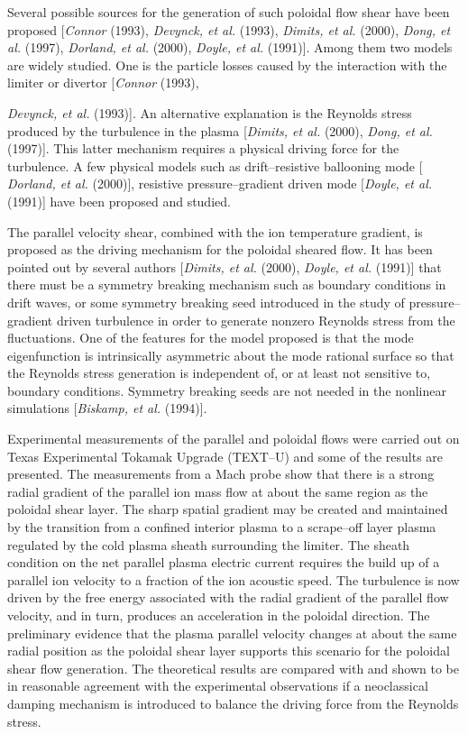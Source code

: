 \documentclass[a4paper,openany,12pt]{book}
\begin{document}
Several possible sources for the generation of such poloidal flow shear have been proposed [\emph{Connor} (1993), \emph{Devynck, et al.} (1993), \emph{Dimits, et al.} (2000), \emph{Dong, et al.} (1997), \emph{Dorland, et al.} (2000), \emph{Doyle, et al.} (1991)]. Among them two models are widely studied. One is the particle losses caused by the interaction with the limiter or divertor [\emph{Connor} (1993), {\emph{Devynck, et al.} (1993)]. An alternative explanation is the Reynolds stress produced by the turbulence in the plasma [\emph{Dimits, et al.} (2000), \emph{Dong, et al.} (1997)]. This latter mechanism requires a physical driving force for the turbulence. A few physical models such as drift--resistive ballooning mode [\emph{ Dorland, et al.} (2000)], resistive pressure--gradient driven mode [\emph{Doyle, et al.} (1991)] have been proposed and studied.

The parallel velocity shear, combined with the ion temperature gradient, is proposed as the driving mechanism for the poloidal sheared flow. It has been pointed out by several authors [\emph{Dimits, et al.} (2000), \emph{Doyle, et al.} (1991)] that there must be a symmetry breaking mechanism such as boundary conditions in drift waves, or some symmetry breaking seed introduced in the study of pressure--gradient driven turbulence in order to generate nonzero Reynolds stress from the fluctuations. One of the features for the model proposed  is that the mode eigenfunction is intrinsically asymmetric about the mode rational surface so that the Reynolds stress generation is independent of, or at least not sensitive to, boundary conditions. Symmetry breaking seeds are not needed in the nonlinear simulations [\emph{Biskamp, et al.} (1994)].

Experimental measurements of the parallel and poloidal flows were carried out on Texas Experimental Tokamak Upgrade (TEXT--U) and some of the results are presented. The measurements from a Mach probe show that there is a strong radial gradient of the parallel ion mass flow at about the same region as the poloidal shear layer. The sharp spatial gradient may be created and maintained by the transition from a confined interior plasma to a scrape--off layer plasma regulated by the cold plasma sheath surrounding the limiter. The sheath condition on the net parallel plasma electric current requires the build up of a parallel ion velocity to a fraction of the ion acoustic speed. The turbulence is now driven by the free energy associated with the radial gradient of the parallel flow velocity, and in turn, produces an acceleration in the poloidal direction. The preliminary evidence that the plasma parallel velocity changes at about the same radial position as the poloidal shear layer supports this scenario for the poloidal shear flow generation. The theoretical results are compared with and shown to be in reasonable agreement with the experimental observations if a neoclassical damping mechanism is introduced to balance the driving force from the Reynolds stress.

}
\end{document}

